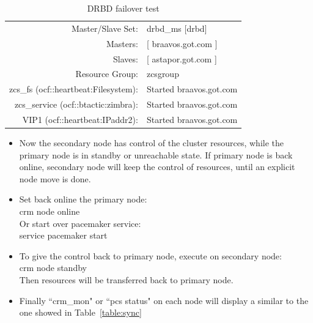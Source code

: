 \documentclass[a4paper, 12pt]{book}
\begin{document}
\FloatBarrier
\begin{table}[H]
  \centering
  \begin{tabular}{ | r l | }
    \hline
      Master/Slave Set: 		& 	drbd\_ms [drbd]\\
      Masters: 					& [ braavos.got.com ]\\
      Slaves: 					& [ astapor.got.com ]\\
      Resource Group: 			& zcsgroup\\
      zcs\_fs (ocf::heartbeat:Filesystem): & Started braavos.got.com\\
      zcs\_service (ocf::btactic:zimbra):  & Started braavos.got.com\\
      VIP1 (ocf::heartbeat:IPaddr2):       & Started braavos.got.com\\
    \hline
  \end{tabular}
\caption{DRBD failover test}
\label{table:failover}
\end{table}



\begin{itemize}
	\item Now the secondary node has control of the cluster resources, while the primary node is in standby or unreachable state. If primary node is back online, secondary node will keep the control of resources, until an explicit node move is done.\\
\end{itemize}


\begin{itemize}
	\item Set back online the primary node:\\
			crm node online\\
		  Or start over pacemaker service:\\
		  	service pacemaker start\\
\end{itemize}


\begin{itemize}
	\item To give the control back to primary node, execute on secondary node:\\
			crm node standby\\
		  Then resources will be transferred back to primary node.\\
\end{itemize}


\begin{itemize}
	\item Finally ``crm\_mon" or ``pcs status" on each node will display a similar to the one showed in Table~\ref{table:sync}
\end{itemize}
\end{document}
